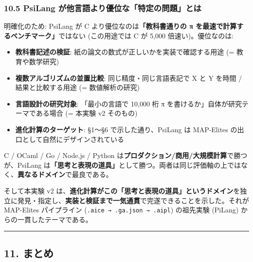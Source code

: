 \documentclass[
]{ltjsarticle}
\providecommand{\tightlist}{%
  \setlength{\itemsep}{0pt}\setlength{\parskip}{0pt}}
\begin{document}
\subsubsection{10.5 PsiLang
が他言語より優位な「特定の問題」とは}\label{psilang-ux304cux4ed6ux8a00ux8a9eux3088ux308aux512aux4f4dux306aux7279ux5b9aux306eux554fux984cux3068ux306f}

明確化のため: PsiLang が C より優位なのは\textbf{「教科書通りの π
を最速で計算するベンチマーク」}ではない (この用途では C が 5,000
倍速い)。優位なのは:

\begin{itemize}
\tightlist
\item
  \textbf{教科書記述の検証}:
  紙の論文の数式が正しいかを実装で確認する用途 (= 教育や数学研究)
\item
  \textbf{複数アルゴリズムの並置比較}: 同じ精度・同じ言語表記で X と Y
  を時間 / 結果と比較する用途 (= 数値解析の研究)
\item
  \textbf{言語設計の研究対象}: 「最小の言語で 10,000 桁 π
  を書けるか」自体が研究テーマである場合 (= 本実験 v2 そのもの)
\item
  \textbf{進化計算のターゲット}: §1〜§6 で示した通り、PsiLang は
  MAP-Elites の出口として自然にデザインされている
\end{itemize}

C / OCaml / Go / Node.js / Python
は\textbf{プロダクション/商用/大規模計算}で勝つが、PsiLang
は\textbf{「思考と表現の道具」}として勝つ。両者は同じ評価軸の上ではなく、\textbf{異なるドメイン}で最良である。

そして本実験 v2
は、\textbf{進化計算がこの「思考と表現の道具」というドメイン}を独立に発見・指定し、\textbf{実装と検証まで一気通貫}で完遂できることを示した。それが
MAP-Elites パイプライン (\texttt{.aice\ →\ .ga.json\ →\ .aipl})
の祖先実験 (PiLang) からの一貫したテーマである。

\begin{center}\rule{0.5\linewidth}{0.5pt}\end{center}

\subsection{11. まとめ}\label{ux307eux3068ux3081}
\end{document}
